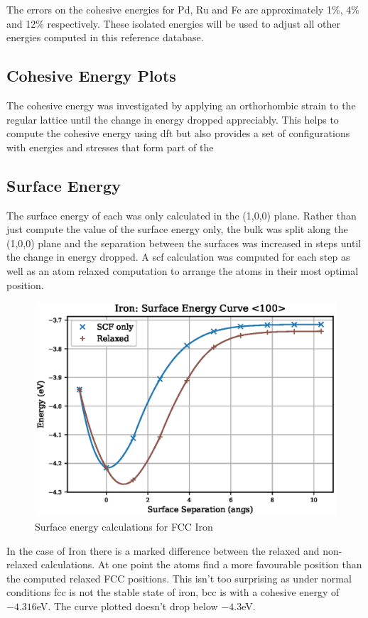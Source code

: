 The errors on the cohesive energies for Pd, Ru and Fe are approximately 1\%, 4\% and 12\% respectively.  These isolated energies will be used to adjust all other energies computed in this reference database.


\subsection{Cohesive Energy Plots}

The cohesive energy was investigated by applying an orthorhombic strain to the regular lattice until the change in energy dropped appreciably.  This helps to compute the cohesive energy using \acrshort{dft} but also provides a set of configurations with energies and stresses that form part of the  







\subsection{Surface Energy}

The surface energy of each was only calculated in the (1,0,0) plane.  Rather than just compute the value of the surface energy only, the bulk was split along the (1,0,0) plane and the separation between the surfaces was increased in steps until the change in energy dropped.  A \acrshort{scf} calculation was computed for each step as well as an atom relaxed computation to arrange the atoms in their most optimal position.

\begin{figure}[h]
\begin{center}
\includegraphics[width=0.5\linewidth]{chapters/results_dft_reference_db/plots/fe/fe_surface_energy.eps}
\caption{Surface energy calculations for FCC Iron}
\label{fig:ironsurfaceenergy}
\end{center}
\end{figure}

In the case of Iron there is a marked difference between the relaxed and non-relaxed calculations.  At one point the atoms find a more favourable position than the computed relaxed FCC positions.  This isn't too surprising as under normal conditions \acrshort{fcc} is not the stable state of iron, \acrshort{bcc} is with a cohesive energy of $-4.316$eV.  The curve plotted doesn't drop below $-4.3$eV.

